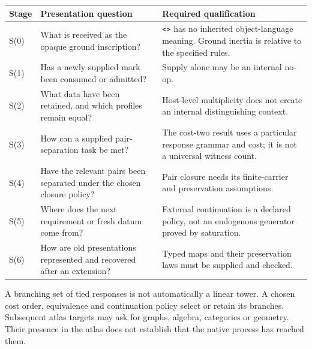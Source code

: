 \documentclass[
  11pt,
]{article}
\begin{document}
\begin{longtable}[]{@{}
  >{\raggedright\arraybackslash}p{}
  >{\raggedright\arraybackslash}p{}
  >{\raggedright\arraybackslash}p{}@{}}
\toprule\noalign{}
\begin{minipage}[b]{\linewidth}\raggedright
Stage
\end{minipage} & \begin{minipage}[b]{\linewidth}\raggedright
Presentation question
\end{minipage} & \begin{minipage}[b]{\linewidth}\raggedright
Required qualification
\end{minipage} \\
\midrule\noalign{}
\endhead
\bottomrule\noalign{}
\endlastfoot
S(0) & What is received as the opaque ground inscription? &
\texttt{\textless{}\textgreater{}} has no inherited object-language
meaning. Ground inertia is relative to the specified rules. \\
S(1) & Has a newly supplied mark been consumed or admitted? & Supply
alone may be an internal no-op. \\
S(2) & What data have been retained, and which profiles remain equal? &
Host-level multiplicity does not create an internal distinguishing
context. \\
S(3) & How can a supplied pair-separation task be met? & The cost-two
result uses a particular response grammar and cost; it is not a
universal witness count. \\
S(4) & Have the relevant pairs been separated under the chosen closure
policy? & Pair closure needs its finite-carrier and preservation
assumptions. \\
S(5) & Where does the next requirement or fresh datum come from? &
External continuation is a declared policy, not an endogenous generator
proved by saturation. \\
S(6) & How are old presentations represented and recovered after an
extension? & Typed maps and their preservation laws must be supplied and
checked. \\
\end{longtable}

A branching set of tied responses is not automatically a linear tower. A
chosen cost order, equivalence and continuation policy select or retain
its branches. Subsequent atlas targets may ask for graphs, algebra,
categories or geometry. Their presence in the atlas does not establish
that the native process has reached them.
\end{document}

